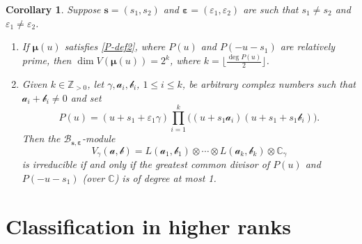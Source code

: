 \documentclass[11pt,reqno]{amsart}
\numberwithin{equation}{section}
\newtheorem{cor}[thm]{Corollary}
\theoremstyle{definition}
\theoremstyle{remark}
\newcommand{\mc}{\mathcal}
\newcommand{\bC}{\mathbb{C}}
\newcommand{\bZ}{\mathbb{Z}}
\newcommand{\lle}{\leqslant}
\newcommand{\BMN}{{\mathscr{B}_{\bm s,\bm \ve}}}
\newcommand{\ve}{\varepsilon}
\newcommand{\s}{{\bm s}}
\begin{document}
\begin{cor}
Suppose $\s=(s_1,s_2)$ and $\bm \ve=(\ve_1,\ve_2)$ are such that $s_1\ne s_2$ and $\ve_1\ne \ve_2$.
\begin{enumerate}
    \item If $\bm\mu(u)$ satisfies \eqref{P-def2}, where $P(u)$ and $P(-u-s_1)$ are relatively prime, then $\dim V(\bm\mu(u))=2^k$, where $k=\big\lfloor\frac{\deg P(u)}{2}\big\rfloor$.
    \item Given $k\in\bZ_{>0}$, let $\gamma,\mc a_i,\mc b_i$, $1\lle i\lle k$, be arbitrary complex numbers such that $\mc a_i+\mc b_i\ne 0$ and set $$P(u)=(u+s_1+\ve_1\gamma)\prod_{i=1}^k\big((u+s_1\mc a_i)(u+s_1+s_1\mc b_i)\big).$$ Then the $\BMN$-module
    \[
    V_{\gamma}(\bm{\mc a,\mc b})=L(\mc a_1,\mc b_1)\otimes \cdots\otimes L(\mc a_k,\mc b_k)\otimes \bC_{\gamma}
    \]
    is irreducible if and only if the greatest common divisor of $P(u)$ and $P(-u-s_1)$ (over $\bC$) is of degree at most 1.
\end{enumerate}
\end{cor}

\section{Classification in higher ranks}\label{sec:classification}
\end{document}
